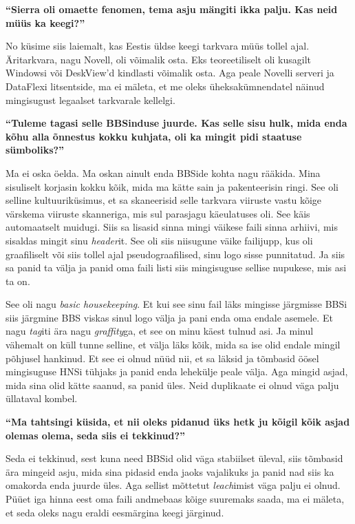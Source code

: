\textbf{\enquote{Sierra oli omaette fenomen, tema asju mängiti ikka palju. Kas neid müüs ka keegi?}}

No küsime siis laiemalt, kas Eestis üldse keegi tarkvara müüs tollel ajal. Äritarkvara, nagu Novell, oli võimalik osta. Eks teoreetiliselt oli kusagilt Windowsi või DeskView'd  kindlasti võimalik osta. Aga peale Novelli serveri ja DataFlexi litsentside, ma ei mäleta, et me oleks üheksakümnendatel näinud mingisugust legaalset tarkvarale kellelgi. 


\textbf{\enquote{Tuleme tagasi selle BBSinduse juurde. Kas selle sisu hulk, mida enda kõhu alla õnnestus kokku kuhjata, oli ka mingit pidi staatuse sümboliks?}}

Ma ei oska öelda. Ma oskan ainult enda BBSide kohta nagu rääkida. Mina sisuliselt korjasin kokku kõik, mida ma kätte sain ja pakenteerisin ringi. See oli selline kultuuriküsimus, et sa skaneerisid selle tarkvara viiruste vastu kõige värskema viiruste skanneriga, mis sul parasjagu käeulatuses oli. See käis automaatselt muidugi. Siis sa lisasid sinna mingi väikese faili sinna arhiivi, mis sisaldas mingit sinu \emph{header}it. See oli siis niisugune väike failijupp, kus oli graafiliselt või siis tollel ajal pseudograafilised, sinu logo sisse punnitatud. Ja siis sa panid ta välja ja panid oma faili listi siis mingisuguse sellise nupukese, mis asi ta on. 

See oli nagu \emph{basic housekeeping}. Et kui see sinu fail läks mingisse järgmisse BBSi siis järgmine BBS viskas sinul logo välja ja pani enda oma endale  asemele. Et nagu \emph{tag}iti ära nagu \emph{graffity}ga, et see on minu käest tulnud asi. Ja minul vähemalt on küll tunne selline, et välja läks kõik, mida sa ise olid endale mingil põhjusel hankinud. Et see ei olnud nüüd nii, et sa läksid ja tõmbasid öösel mingisuguse HNSi tühjaks ja panid enda lehekülje peale välja. Aga mingid asjad, mida sina olid kätte saanud, sa panid üles. Neid duplikaate ei olnud väga palju üllataval kombel.

\textbf{\enquote{Ma tahtsingi küsida, et nii oleks pidanud üks hetk ju kõigil kõik asjad olemas olema, seda siis ei tekkinud?}}

Seda ei tekkinud, sest kuna need BBSid olid väga stabiilset üleval, siis tõmbasid ära mingeid asju, mida sina pidasid enda jaoks vajalikuks ja panid nad siis ka omakorda enda juurde üles. Aga sellist mõttetut \emph{leach}imist  väga palju ei olnud. Püüet iga hinna eest oma faili andmebaas kõige suuremaks saada, ma ei mäleta, et seda oleks nagu eraldi eesmärgina keegi järginud. 

